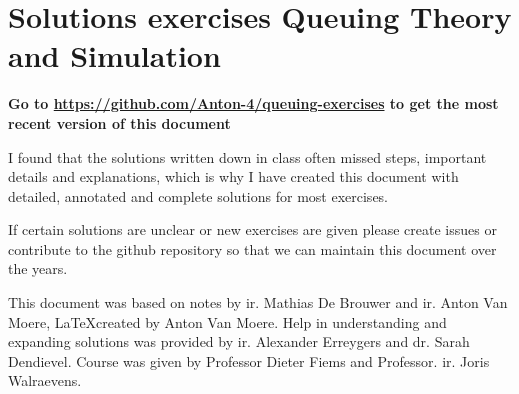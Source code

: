 \documentclass[a4paper,11pt]{article}
\begin{document}
\section*{Solutions exercises Queuing Theory and Simulation}

\textbf{Go to \url{https://github.com/Anton-4/queuing-exercises} to get the most recent version of this document}

I found that the solutions written down in class often missed steps, important details and explanations, which is why I have created this document with detailed,
annotated and complete solutions for most exercises.

If certain solutions are unclear or new exercises are given please create issues or contribute to the github repository so that we can maintain this document over the years.

This document was based on notes by ir. Mathias De Brouwer and ir. Anton Van Moere, \LaTeX created by Anton Van Moere.
Help in understanding and expanding solutions was provided by ir. Alexander Erreygers and dr. Sarah Dendievel.
Course was given by Professor Dieter Fiems and Professor. ir. Joris Walraevens.


















\end{document}

